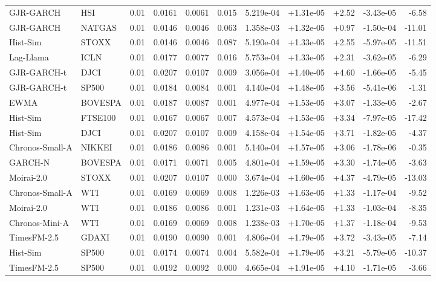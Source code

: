 \begin{tabular}{llrrrrrrrrr}
GJR-GARCH & HSI & 0.01 & 0.0161 & 0.0061 & 0.015 & 5.219e-04 & +1.31e-05 & +2.52 & -3.43e-05 & -6.58 \\
GJR-GARCH & NATGAS & 0.01 & 0.0146 & 0.0046 & 0.063 & 1.358e-03 & +1.32e-05 & +0.97 & -1.50e-04 & -11.01 \\
Hist-Sim & STOXX & 0.01 & 0.0146 & 0.0046 & 0.087 & 5.190e-04 & +1.33e-05 & +2.55 & -5.97e-05 & -11.51 \\
Lag-Llama & ICLN & 0.01 & 0.0177 & 0.0077 & 0.016 & 5.753e-04 & +1.33e-05 & +2.31 & -3.62e-05 & -6.29 \\
GJR-GARCH-t & DJCI & 0.01 & 0.0207 & 0.0107 & 0.009 & 3.056e-04 & +1.40e-05 & +4.60 & -1.66e-05 & -5.45 \\
GJR-GARCH-t & SP500 & 0.01 & 0.0184 & 0.0084 & 0.001 & 4.140e-04 & +1.48e-05 & +3.56 & -5.41e-06 & -1.31 \\
EWMA & BOVESPA & 0.01 & 0.0187 & 0.0087 & 0.001 & 4.977e-04 & +1.53e-05 & +3.07 & -1.33e-05 & -2.67 \\
Hist-Sim & FTSE100 & 0.01 & 0.0167 & 0.0067 & 0.007 & 4.573e-04 & +1.53e-05 & +3.34 & -7.97e-05 & -17.42 \\
Hist-Sim & DJCI & 0.01 & 0.0207 & 0.0107 & 0.009 & 4.158e-04 & +1.54e-05 & +3.71 & -1.82e-05 & -4.37 \\
Chronos-Small-A & NIKKEI & 0.01 & 0.0186 & 0.0086 & 0.001 & 5.140e-04 & +1.57e-05 & +3.06 & -1.78e-06 & -0.35 \\
GARCH-N & BOVESPA & 0.01 & 0.0171 & 0.0071 & 0.005 & 4.801e-04 & +1.59e-05 & +3.30 & -1.74e-05 & -3.63 \\
Moirai-2.0 & STOXX & 0.01 & 0.0207 & 0.0107 & 0.000 & 3.674e-04 & +1.60e-05 & +4.37 & -4.79e-05 & -13.03 \\
Chronos-Small-A & WTI & 0.01 & 0.0169 & 0.0069 & 0.008 & 1.226e-03 & +1.63e-05 & +1.33 & -1.17e-04 & -9.52 \\
Moirai-2.0 & WTI & 0.01 & 0.0186 & 0.0086 & 0.001 & 1.231e-03 & +1.64e-05 & +1.33 & -1.03e-04 & -8.35 \\
Chronos-Mini-A & WTI & 0.01 & 0.0169 & 0.0069 & 0.008 & 1.238e-03 & +1.70e-05 & +1.37 & -1.18e-04 & -9.53 \\
TimesFM-2.5 & GDAXI & 0.01 & 0.0190 & 0.0090 & 0.001 & 4.806e-04 & +1.79e-05 & +3.72 & -3.43e-05 & -7.14 \\
Hist-Sim & SP500 & 0.01 & 0.0174 & 0.0074 & 0.004 & 5.582e-04 & +1.79e-05 & +3.21 & -5.79e-05 & -10.37 \\
TimesFM-2.5 & SP500 & 0.01 & 0.0192 & 0.0092 & 0.000 & 4.665e-04 & +1.91e-05 & +4.10 & -1.71e-05 & -3.66 \\

\end{tabular}
